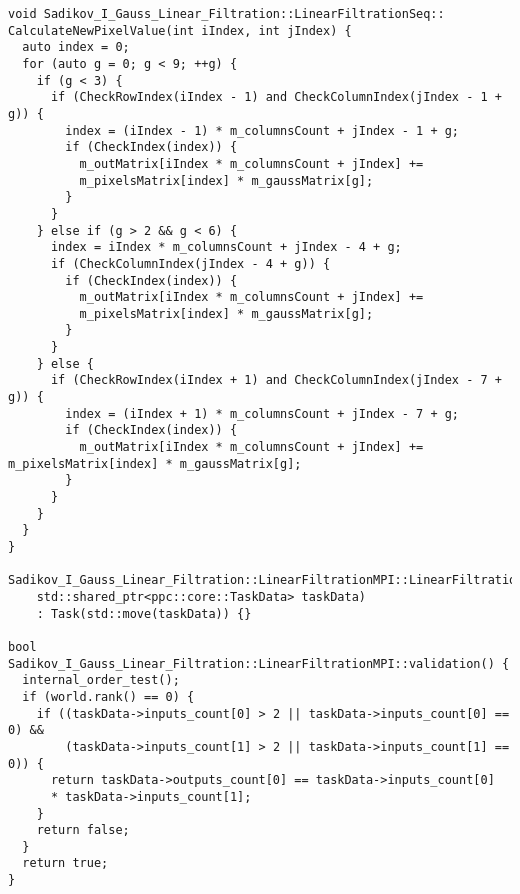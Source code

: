 \documentclass[a4paper,14pt]{report}
\begin{document}
\begin{verbatim}
void Sadikov_I_Gauss_Linear_Filtration::LinearFiltrationSeq::
CalculateNewPixelValue(int iIndex, int jIndex) {
  auto index = 0;
  for (auto g = 0; g < 9; ++g) {
    if (g < 3) {
      if (CheckRowIndex(iIndex - 1) and CheckColumnIndex(jIndex - 1 + g)) {
        index = (iIndex - 1) * m_columnsCount + jIndex - 1 + g;
        if (CheckIndex(index)) {
          m_outMatrix[iIndex * m_columnsCount + jIndex] += 
          m_pixelsMatrix[index] * m_gaussMatrix[g];
        }
      }
    } else if (g > 2 && g < 6) {
      index = iIndex * m_columnsCount + jIndex - 4 + g;
      if (CheckColumnIndex(jIndex - 4 + g)) {
        if (CheckIndex(index)) {
          m_outMatrix[iIndex * m_columnsCount + jIndex] += 
          m_pixelsMatrix[index] * m_gaussMatrix[g];
        }
      }
    } else {
      if (CheckRowIndex(iIndex + 1) and CheckColumnIndex(jIndex - 7 + g)) {
        index = (iIndex + 1) * m_columnsCount + jIndex - 7 + g;
        if (CheckIndex(index)) {
          m_outMatrix[iIndex * m_columnsCount + jIndex] += m_pixelsMatrix[index] * m_gaussMatrix[g];
        }
      }
    }
  }
}

Sadikov_I_Gauss_Linear_Filtration::LinearFiltrationMPI::LinearFiltrationMPI(
    std::shared_ptr<ppc::core::TaskData> taskData)
    : Task(std::move(taskData)) {}

bool Sadikov_I_Gauss_Linear_Filtration::LinearFiltrationMPI::validation() {
  internal_order_test();
  if (world.rank() == 0) {
    if ((taskData->inputs_count[0] > 2 || taskData->inputs_count[0] == 0) &&
        (taskData->inputs_count[1] > 2 || taskData->inputs_count[1] == 0)) {
      return taskData->outputs_count[0] == taskData->inputs_count[0] 
      * taskData->inputs_count[1];
    }
    return false;
  }
  return true;
}


\end{verbatim}
\end{document}
